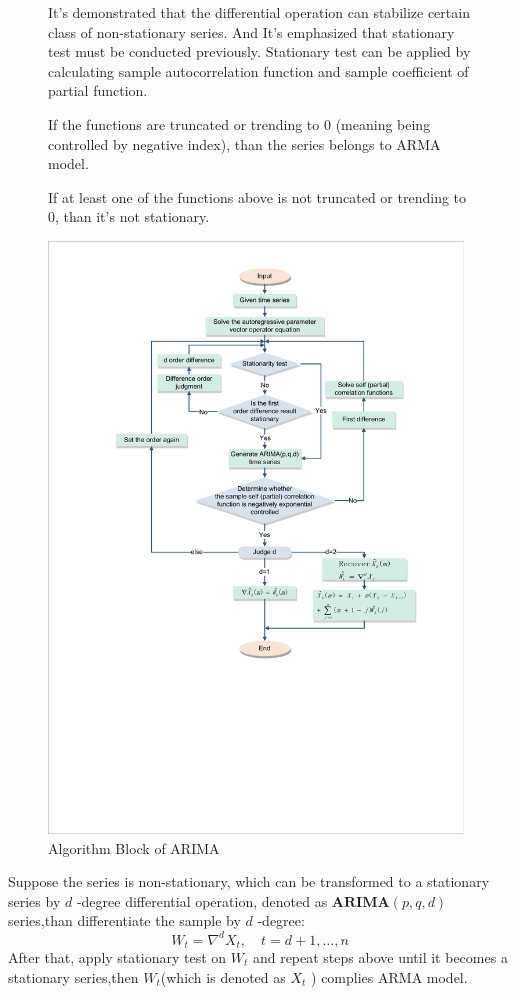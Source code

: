 \documentclass{mcmthesis}
\numberwithin{figure}{section}
\numberwithin{table}{section}
\numberwithin{equation}{section}
\begin{document}
\begin{figure}[ht]
\begin{minipage}[htbp]{0.3\linewidth}
It's demonstrated that the differential operation can stabilize 
certain class of non-stationary series. And It's emphasized that 
stationary test must be conducted previously. Stationary test can 
be applied by calculating sample autocorrelation function and 
sample coefficient of partial function. 
\par
If the functions are truncated or trending to 0 (meaning being controlled
by negative index), than the series belongs to ARMA model.
\par
If at least one of the functions above is not truncated or trending to 0, than
it's not stationary.
\par

\end{minipage}
\hfill
\begin{minipage}[htbp]{0.67\linewidth}
  \begin{flushleft}
    \includegraphics[width =11cm]{code&pic/ARIMA_裁剪页面.pdf}
   \caption{Algorithm Block of ARIMA}\label{ARIMA_ALGO}
  \end{flushleft}
\end{minipage}
\end{figure}
Suppose the series is non-stationary, which can be transformed to 
a stationary series by $ d $ -degree differential operation, denoted
as $ \mathbf{ARIMA}(p,q,d) $ series,than differentiate the sample by
$ d $ -degree:
$$
  W_t = \nabla^dX_t,\quad t = d+1,\dots , n
$$ 
After that, apply stationary test on $ W_t $ and repeat steps above 
until it becomes a stationary series,then $ W_t $(which is denoted
as $ X_t $ ) complies ARMA model. 
\par
\end{document}
